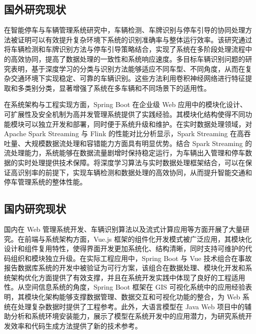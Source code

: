 \documentclass{wzuthesis} %
\begin{document}
\subsection{国外研究现状}

在智能停车与车辆管理系统研究中，车辆检测、车牌识别与停车引导的协同处理方法被证明可以有效提升复杂环境下系统的识别准确率与整体运行效率。该研究通过将车辆检测和车牌识别方法与停车引导策略结合，实现了系统在多阶段处理流程中的高效协同，提高了数据处理的一致性和系统响应速度。多目标车辆识别问题的研究表明，基于深度学习的分类与识别方法能够适应不同车型、不同角度，从而在复杂交通环境下实现稳定、可靠的车辆识别。这些方法利用卷积神经网络进行特征提取和多类别分类，显著增强了系统在多车辆和不同场景下的适用性。

在系统架构与工程实现方面，Spring Boot 在企业级 Web 应用中的模块化设计、可扩展性及安全机制为高并发管理系统提供了实践经验。其模块化结构使得不同功能模块可以独立开发和部署，同时便于系统升级和维护。在实时数据处理领域，对 Apache Spark Streaming 与 Flink 的性能对比分析显示，Spark Streaming 在高吞吐量、大规模数据流处理和容错能力方面具有明显优势。结合 Spark Streaming 的流处理能力，系统能够在数据流量剧增时保持稳定运行，为车辆出入管理和停车数据的实时处理提供技术保障。将深度学习算法与实时数据处理框架结合，可以在保证高识别率的前提下，实现车辆检测和数据处理的高效协同，从而提升智能交通和停车管理系统的整体性能。

\subsection{国内研究现状}

国内在 Web 管理系统开发、车辆识别算法以及流式计算应用等方面开展了大量研究。在前端与系统架构方面，Vue.js 框架的组件化开发模式被广泛应用，其模块化设计和组件复用特性，使得界面开发更加系统化、结构清晰，同时支持可维护的代码组织和模块独立升级。在实际工程应用中，Spring Boot 与 Vue 技术组合在事故报告数据库系统的开发中被验证为可行方案，该组合在数据处理、模块化开发和系统架构优化方面提供了有效支撑，并且在系统开发实践中体现了良好的工程适用性。从空间信息系统的角度，Spring Boot 框架在 GIS 可视化系统中的应用经验表明，其模块化架构能够支撑数据管理、数据交互和可视化功能的整合，为 Web 系统在处理复杂数据时提供了工程参考。此外，大语言模型在 Java Web 项目中的辅助分析和系统环境安装能力，展示了模型在系统开发中的应用潜力，为研究系统开发效率和代码生成方法提供了新的技术参考。
\end{document}
